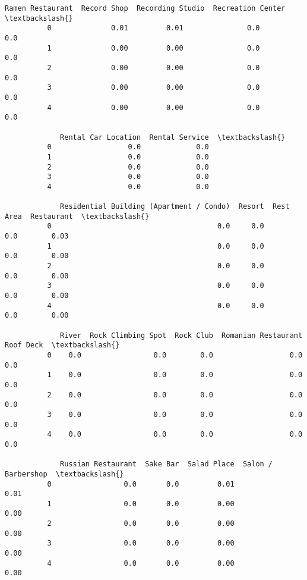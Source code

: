 \documentclass[11pt]{article}
\begin{document}
\begin{Verbatim}[commandchars=\\\{\}]
             Ramen Restaurant  Record Shop  Recording Studio  Recreation Center  \textbackslash{}
          0              0.01         0.01               0.0                0.0   
          1              0.00         0.00               0.0                0.0   
          2              0.00         0.00               0.0                0.0   
          3              0.00         0.00               0.0                0.0   
          4              0.00         0.00               0.0                0.0   
          
             Rental Car Location  Rental Service  \textbackslash{}
          0                  0.0             0.0   
          1                  0.0             0.0   
          2                  0.0             0.0   
          3                  0.0             0.0   
          4                  0.0             0.0   
          
             Residential Building (Apartment / Condo)  Resort  Rest Area  Restaurant  \textbackslash{}
          0                                       0.0     0.0        0.0        0.03   
          1                                       0.0     0.0        0.0        0.00   
          2                                       0.0     0.0        0.0        0.00   
          3                                       0.0     0.0        0.0        0.00   
          4                                       0.0     0.0        0.0        0.00   
          
             River  Rock Climbing Spot  Rock Club  Romanian Restaurant  Roof Deck  \textbackslash{}
          0    0.0                 0.0        0.0                  0.0        0.0   
          1    0.0                 0.0        0.0                  0.0        0.0   
          2    0.0                 0.0        0.0                  0.0        0.0   
          3    0.0                 0.0        0.0                  0.0        0.0   
          4    0.0                 0.0        0.0                  0.0        0.0   
          
             Russian Restaurant  Sake Bar  Salad Place  Salon / Barbershop  \textbackslash{}
          0                 0.0       0.0         0.01                0.01   
          1                 0.0       0.0         0.00                0.00   
          2                 0.0       0.0         0.00                0.00   
          3                 0.0       0.0         0.00                0.00   
          4                 0.0       0.0         0.00                0.00   
          

\end{Verbatim}
\end{document}
